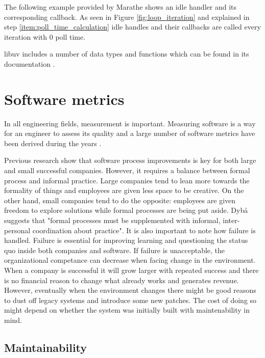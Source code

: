 The following example provided by Marathe \cite{uvbook} shows an idle handler
and its corresponding callback. As seen in Figure \ref{fig:loop_iteration} and
explained in step \ref{item:poll_time_calculation} idle handles and their
callbacks are called every iteration with 0 poll time.



libuv includes a number of data types and functions which can be found in its
documentation \cite{libuv-docs}.

\section{Software metrics}

In all engineering fields, measurement is important. Measuring software is a
way for an engineer to assess its quality and a large number of software
metrics have been derived during the years \cite{aggarwal2006empirical}.

Previous research show that software process improvements is key for both large
and small successful companies. However, it requires a balance between formal
process and informal practice. Large companies tend to lean more towards the
formality of things and employees are given less space to be creative. On the
other hand, small companies tend to do the opposite: employees are given
freedom to explore solutions while formal processes are being put aside. Dybå
\cite{dybaa2003factors} suggests that "formal processes must be supplemented
with informal, inter-personal coordination about practice". It is also
important to note how failure is handled. Failure is essential for improving
learning and questioning the status quo inside both companies and software. If
failure is unacceptable, the organizational competance can decrease when facing
change in the environment. When a company is successful it will grow larger
with repeated success and there is no financial reason to change what already
works and generates revenue. However, eventually when the environment changes
there might be good reasons to dust off legacy systems and introduce some new
patches. The cost of doing so might depend on whether the system was initially
built with maintenability in mind. \cite{dybaa2003factors}

\subsection{Maintainability}

